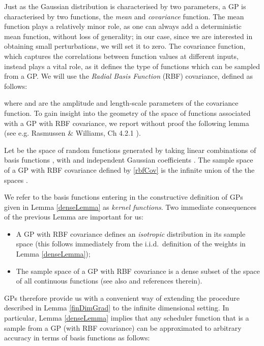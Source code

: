 Just as the Gaussian distribution is characterised by two parameters, a GP is characterised by two functions, the {\it mean} and {\it covariance} function. The mean function plays a relatively minor role, as one can always add a deterministic mean function, without loss of generality; in our case, since we are interested in obtaining small perturbations, we will set it to zero. The covariance function, which captures the correlations between function values at different inputs, instead plays a vital role, as it defines the type of functions which can be sampled from a GP. We will use the {\it Radial Basis Function} (RBF) covariance, defined as follows:

where  and  are the amplitude and length-scale parameters of the covariance function.
To gain insight into the geometry of the space of functions associated with a GP with RBF covariance, we report without proof the following lemma (see e.g. Rasmussen \& Williams, Ch 4.2.1 \cite{Rasmussen2006}).
\begin{lemma}\label{denseLemma}
Let  be the space of random functions   generated by taking linear combinations of basis functions  , with  and independent Gaussian coefficients .
The sample space of a GP with RBF covariance defined by \eqref{rbfCov} is the infinite union of the the spaces .
\end{lemma}

We refer to the basis functions entering in the constructive definition of GPs given in Lemma \ref{denseLemma} as {\it kernel functions}. Two immediate consequences of the previous Lemma are important for us:\begin{itemize}
\item{A GP with RBF covariance defines an {\it isotropic} distribution in its sample space (this follows immediately from the i.i.d.\ definition of the weights in Lemma \ref{denseLemma})};
\item{The sample space of a GP with RBF covariance is a dense subset of the space of all continuous functions (see also \cite{bortolussi:smoothed16} and references therein).}
\end{itemize}





GPs therefore provide us with a convenient way of extending the procedure described in Lemma \ref{finDimGrad} to the infinite dimensional setting.
In particular, Lemma \ref{denseLemma} implies that any scheduler function  that is a sample from a GP (with RBF covariance) can be approximated to arbitrary accuracy in terms of basis functions as follows:

